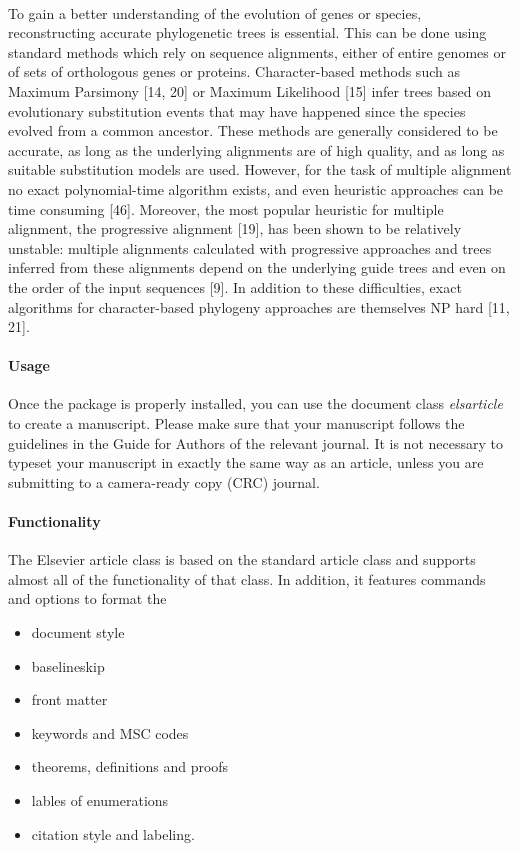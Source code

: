 \documentclass[review]{elsarticle}
\begin{document}
\paragraph{} To gain a better understanding of the evolution of genes or species, reconstructing accurate phylogenetic trees is essential. This can be done using
standard methods which rely on sequence alignments, either of entire genomes
or of sets of orthologous genes or proteins. Character-based methods such as
Maximum Parsimony [14, 20] or Maximum Likelihood [15] infer trees based
on evolutionary substitution events that may have happened since the species
evolved from a common ancestor. These methods are generally considered to
be accurate, as long as the underlying alignments are of high quality, and as
long as suitable substitution models are used. However, for the task of multiple alignment no exact polynomial-time algorithm exists, and even heuristic
approaches can be time consuming [46]. Moreover, the most popular heuristic for multiple alignment, the progressive alignment [19], has been shown to
be relatively unstable: multiple alignments calculated with progressive approaches and trees inferred from these alignments depend on the underlying
guide trees and even on the order of the input sequences [9]. In addition to
these difficulties, exact algorithms for character-based phylogeny approaches
are themselves NP hard [11, 21].

\paragraph{Usage} Once the package is properly installed, you can use the document class \emph{elsarticle} to create a manuscript. Please make sure that your manuscript follows the guidelines in the Guide for Authors of the relevant journal. It is not necessary to typeset your manuscript in exactly the same way as an article, unless you are submitting to a camera-ready copy (CRC) journal.

\paragraph{Functionality} The Elsevier article class is based on the standard article class and supports almost all of the functionality of that class. In addition, it features commands and options to format the
\begin{itemize}
\item document style
\item baselineskip
\item front matter
\item keywords and MSC codes
\item theorems, definitions and proofs
\item lables of enumerations
\item citation style and labeling.
\end{itemize}
\end{document}
